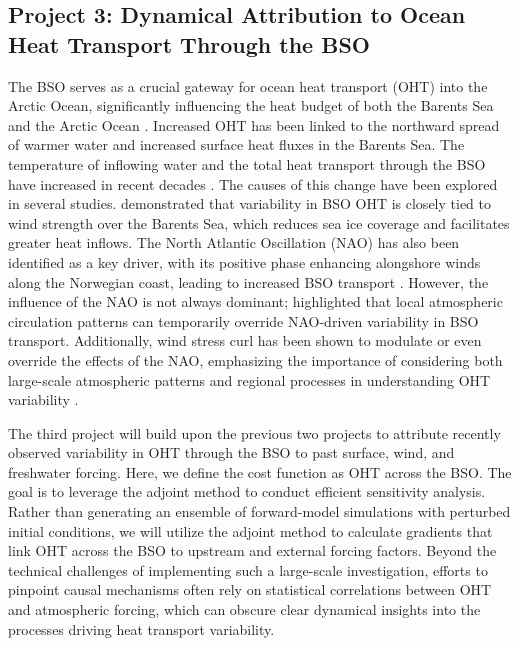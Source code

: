 \documentclass[draft]{agujournal2019}
\begin{document}

\subsection{Project 3: Dynamical Attribution to Ocean Heat Transport Through the BSO}

The BSO serves as a crucial gateway for ocean heat transport (OHT) into the Arctic Ocean, significantly influencing the heat budget of both the Barents Sea \cite{Ingvaldsen2002, Arthun2012} and the Arctic Ocean \cite{Oldenburg2024}. Increased OHT has been linked to the northward spread of warmer water \cite{Smedsrud2010} and increased surface heat fluxes \cite{Smedsrud2013} in the Barents Sea. The temperature of inflowing water and the total heat transport through the BSO have increased in recent decades \cite{muilwijk2018, Wang2019, Arthun2019}. The causes of this change have been explored in several studies.  demonstrated that variability in BSO OHT is closely tied to wind strength over the Barents Sea, which reduces sea ice coverage and facilitates greater heat inflows. The North Atlantic Oscillation (NAO) has also been identified as a key driver, with its positive phase enhancing alongshore winds along the Norwegian coast, leading to increased BSO transport \cite{Ingvaldsen2002}. However, the influence of the NAO is not always dominant;  highlighted that local atmospheric circulation patterns can temporarily override NAO-driven variability in BSO transport. Additionally, wind stress curl has been shown to modulate or even override the effects of the NAO, emphasizing the importance of considering both large-scale atmospheric patterns and regional processes in understanding OHT variability \cite{muilwijk2018}.

The third project will build upon the previous two projects to attribute recently observed variability in OHT through the BSO to past surface, wind, and freshwater forcing. Here, we define the cost function as OHT across the BSO. The goal is to leverage the adjoint method to conduct efficient sensitivity analysis. Rather than generating an ensemble of forward-model simulations with perturbed initial conditions, we will utilize the adjoint method to calculate gradients that link OHT across the BSO to upstream and external forcing factors. Beyond the technical challenges of implementing such a large-scale investigation, efforts to pinpoint causal mechanisms often rely on statistical correlations between OHT and atmospheric forcing, which can obscure clear dynamical insights into the processes driving heat transport variability.
\end{document}
